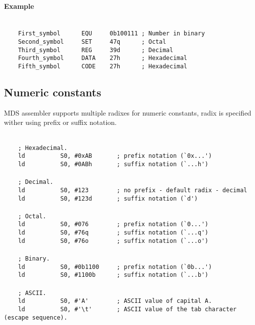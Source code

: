        \paragraph{Example}
        ~\\
        \verb'    First_symbol      EQU     0b100111 ; Number in binary'\\
        \verb'    Second_symbol     SET     47q      ; Octal'\\
        \verb'    Third_symbol      REG     39d      ; Decimal'\\
        \verb'    Fourth_symbol     DATA    27h      ; Hexadecimal'\\
        \verb'    Fifth_symbol      CODE    27h      ; Hexadecimal'

    \clearpage
    \subsection{Numeric constants}
        MDS assembler supports multiple radixes for numeric constants, radix is specified wither using prefix or suffix notation.

        ~\\
        \verb"    ; Hexadecimal."\\
        \verb"    ld          S0, #0xAB       ; prefix notation (`0x...')"\\
        \verb"    ld          S0, #0ABh       ; suffix notation (`...h')"\\
        \verb""\\
        \verb"    ; Decimal."\\
        \verb"    ld          S0, #123        ; no prefix - default radix - decimal"\\
        \verb"    ld          S0, #123d       ; suffix notation (`d')"\\
        \verb""\\
        \verb"    ; Octal."\\
        \verb"    ld          S0, #076        ; prefix notation (`0...')"\\
        \verb"    ld          S0, #76q        ; suffix notation (`...q')"\\
        \verb"    ld          S0, #76o        ; suffix notation (`...o')"\\
        \verb""\\
        \verb"    ; Binary."\\
        \verb"    ld          S0, #0b1100     ; prefix notation (`0b...')"\\
        \verb"    ld          S0, #1100b      ; suffix notation (`...b')"\\
        \verb""\\
        \verb"    ; ASCII."\\
        \verb"    ld          S0, #'A'        ; ASCII value of capital A."\\
        \verb"    ld          S0, #'\t'       ; ASCII value of the tab character (escape sequence)."

